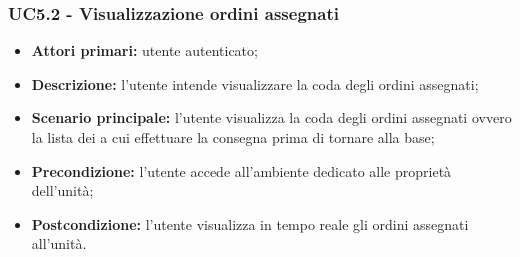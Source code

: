         \subsubsection{UC5.2 - Visualizzazione ordini assegnati}
        \begin{itemize}
            \item \textbf{Attori primari:} utente autenticato;
            \item \textbf{Descrizione:} l'utente intende visualizzare la coda degli ordini assegnati;
            \item \textbf{Scenario principale:} l'utente visualizza la coda degli ordini assegnati ovvero la lista dei  a cui effettuare la consegna prima di tornare alla base;
            \item \textbf{Precondizione:} l'utente accede all'ambiente dedicato alle proprietà dell'unità;
            \item \textbf{Postcondizione:} l'utente visualizza in tempo reale gli ordini assegnati all'unità.
        \end{itemize}



